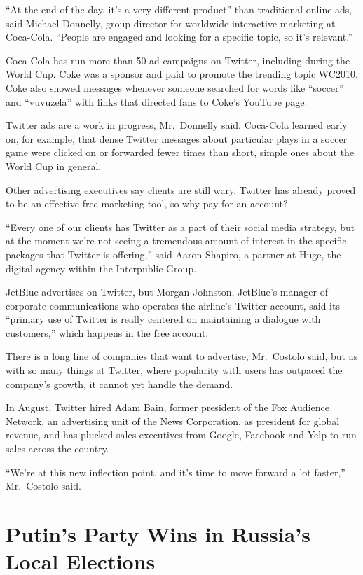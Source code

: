 ﻿\documentclass[12pt]{article}
\begin{document}
``At the end of the day, it's a very different product'' than traditional online ads, said Michael
Donnelly, group director for worldwide interactive marketing at Coca-Cola. ``People are engaged and
looking for a specific topic, so it's relevant.''

Coca-Cola has run more than 50 ad campaigns on Twitter, including during the World Cup. Coke was a
sponsor and paid to promote the trending topic WC2010. Coke also showed messages whenever someone
searched for words like ``soccer'' and ``vuvuzela'' with links that directed fans to Coke's YouTube
page.

Twitter ads are a work in progress, Mr.~Donnelly said. Coca-Cola learned early on, for example, that
dense Twitter messages about particular plays in a soccer game were clicked on or forwarded fewer
times than short, simple ones about the World Cup in general.

Other advertising executives say clients are still wary. Twitter has already proved to be an
effective free marketing tool, so why pay for an account?

``Every one of our clients has Twitter as a part of their social media strategy, but at the moment
we're not seeing a tremendous amount of interest in the specific packages that Twitter is
offering,'' said Aaron Shapiro, a partner at Huge, the digital agency within the Interpublic Group.

JetBlue advertises on Twitter, but Morgan Johnston, JetBlue's manager of corporate communications
who operates the airline's Twitter account, said its ``primary use of Twitter is really centered on
maintaining a dialogue with customers,'' which happens in the free account.

There is a long line of companies that want to advertise, Mr.~Costolo said, but as with so many
things at Twitter, where popularity with users has outpaced the company's growth, it cannot yet
handle the demand.

In August, Twitter hired Adam Bain, former president of the Fox Audience Network, an advertising
unit of the News Corporation, as president for global revenue, and has plucked sales executives from
Google, Facebook and Yelp to run sales across the country.

``We're at this new inflection point, and it's time to move forward a lot faster,'' Mr.~Costolo
said.

\section{Putin's Party Wins in Russia's Local Elections}
\end{document}
